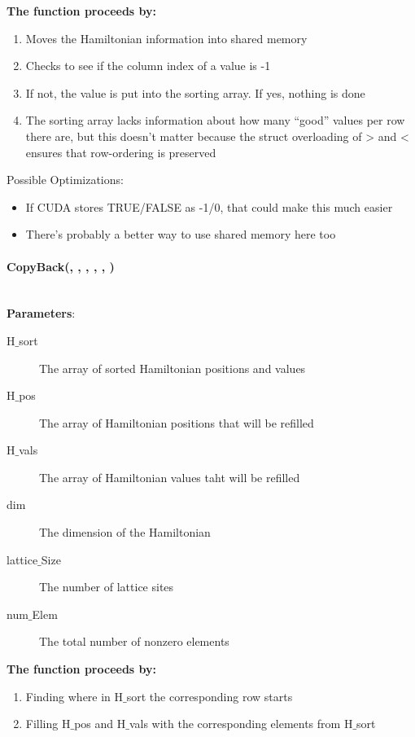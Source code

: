 \documentclass{article}
\begin{document}
\noindent\textbf{The function proceeds by:}
\begin{enumerate}
\item{Moves the Hamiltonian information into shared memory}
\item{Checks to see if the column index of a value is -1}
\item{If not, the value is put into the sorting array. If yes, nothing is done}
\item{The sorting array lacks information about how many ``good'' values per row there are, but this doesn't matter because the struct overloading of > and < ensures that row-ordering is preserved }
\end{enumerate}

Possible Optimizations:
\begin{itemize}
\item{If CUDA stores TRUE/FALSE as -1/0, that could make this much easier}
\item{There's probably a better way to use shared memory here too}
\end{itemize}

\paragraph{\cudaglobal \void CopyBack(\hamstruct , \typelongtwoptr, \cuDoubleComplex , \long , \int, \long ) \\ \\}
\noindent\textbf{Parameters}:
\begin{description}
\item[\hamstruct H$\_$sort] The array of sorted Hamiltonian positions and values
\item[\typelongtwoptr H$\_$pos] The array of Hamiltonian positions that will be refilled
\item[\cuDoubleComplex H$\_$vals] The array of Hamiltonian values taht will be refilled
\item[\long dim] The dimension of the Hamiltonian
\item[\int lattice$\_$Size] The number of lattice sites
\item[\long num$\_$Elem] The total number of nonzero elements
\end{description}

\noindent\textbf{The function proceeds by:}
\begin{enumerate}
\item{Finding where in H$\_$sort the corresponding row starts}
\item{Filling H$\_$pos and H$\_$vals with the corresponding elements from H$\_$sort}
\end{enumerate}
\end{document}
